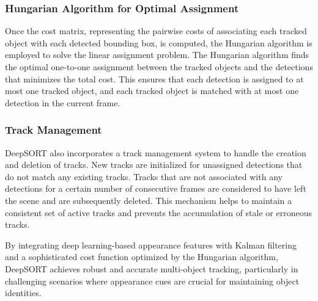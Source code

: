 \subsubsection{Hungarian Algorithm for Optimal Assignment}

Once the cost matrix, representing the pairwise costs of associating each tracked object with each detected bounding box, is computed, the Hungarian algorithm is employed to solve the linear assignment problem. The Hungarian algorithm finds the optimal one-to-one assignment between the tracked objects and the detections that minimizes the total cost. This ensures that each detection is assigned to at most one tracked object, and each tracked object is matched with at most one detection in the current frame.

\subsubsection{Track Management}

DeepSORT also incorporates a track management system to handle the creation and deletion of tracks. New tracks are initialized for unassigned detections that do not match any existing tracks. Tracks that are not associated with any detections for a certain number of consecutive frames are considered to have left the scene and are subsequently deleted. This mechanism helps to maintain a consistent set of active tracks and prevents the accumulation of stale or erroneous tracks.

By integrating deep learning-based appearance features with Kalman filtering and a sophisticated cost function optimized by the Hungarian algorithm, DeepSORT achieves robust and accurate multi-object tracking, particularly in challenging scenarios where appearance cues are crucial for maintaining object identities.




